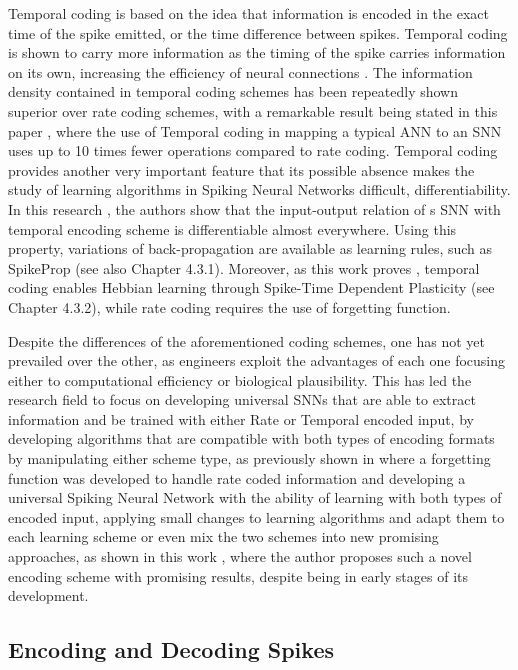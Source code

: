\documentclass[12pt]{report}
\begin{document}
Temporal coding is based on the idea that information is encoded in the exact time of the spike emitted, or the time difference between spikes. Temporal coding is shown to carry more information as the timing of the spike carries information on its own, increasing the efficiency of neural connections \cite{Mainen2009}. The information density contained in temporal coding schemes has been repeatedly shown superior over rate coding schemes, with a remarkable result being stated in this paper \cite{IEEE2018}, where the use of Temporal coding in mapping a typical ANN to an SNN uses up to 10 times fewer operations compared to rate coding. Temporal coding provides another very important feature that its possible absence makes the study of learning algorithms in Spiking Neural Networks difficult, differentiability. In this research \cite{Mostafa2018}, the authors show that the input-output relation of s SNN with temporal encoding scheme is differentiable almost everywhere. Using this property, variations of back-propagation are available as learning rules, such as SpikeProp \cite{Bohte2002} (see also Chapter 4.3.1). Moreover, as this work proves \cite{Lobov2020}, temporal coding enables Hebbian learning through Spike-Time Dependent Plasticity (see Chapter 4.3.2), while rate coding requires the use of forgetting function.

\medskip
Despite the differences of the aforementioned coding schemes, one has not yet prevailed over the other, as engineers exploit the advantages of each one focusing either to computational efficiency or biological plausibility. This has led the research field to focus on developing universal SNNs that are able to extract information and be trained with either Rate or Temporal encoded input, by developing algorithms that are compatible with both types of encoding formats by manipulating either scheme type, as previously shown in \cite{Lobov2020} where a forgetting function was developed to handle rate coded information and developing a universal Spiking Neural Network with the ability of learning with both types of encoded input, applying small changes to learning algorithms and adapt them to each learning scheme \cite{Yin201} or even mix the two schemes into new promising approaches, as shown in this work \cite{Kiselev2016}, where the author proposes such a novel encoding scheme with promising results, despite being in early stages of its development.

\subsection{Encoding and Decoding Spikes}
\end{document}
